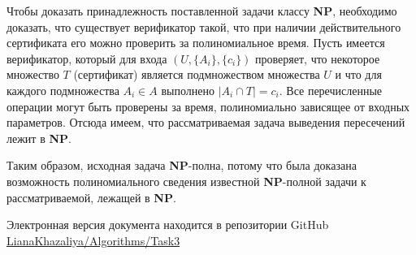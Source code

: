 \documentclass[10pt]{article}
\begin{document}
\medskip\par 
Чтобы доказать принадлежность поставленной задачи классу \textbf{NP}, необходимо доказать, что существует верификатор такой, что при наличии действительного сертификата его можно проверить за полиномиальное время. Пусть имеется верификатор, который для входа $(U, \{A_i\},\{c_i\})$ проверяет, что некоторое множество $T$ (сертификат) является подмножеством множества $U$ и что для каждого подмножества $A_i \in A$ выполнено $|A_i\cap T| = c_i$. Все перечисленные операции могут быть проверены за время, полиномиально зависящее от входных параметров. Отсюда имеем, что рассматриваемая задача выведения пересечений лежит в \textbf{NP}.
\medskip\par 
Таким образом, исходная задача \textbf{NP}-полна, потому что была доказана возможность полиномиального сведения известной \textbf{NP}-полной задачи к рассматриваемой, лежащей в \textbf{NP}. 
\ \\[0.2 cm]
\hline

\begin{flushright}
Электронная версия документа находится в репозитории GitHub \\
\href{https://github.com/LianaKhazaliya/Algorithms/blob/master/Task3/NP_completeness.pdf}{LianaKhazaliya/Algorithms/Task3}
\end{flushright}
\end{document}
